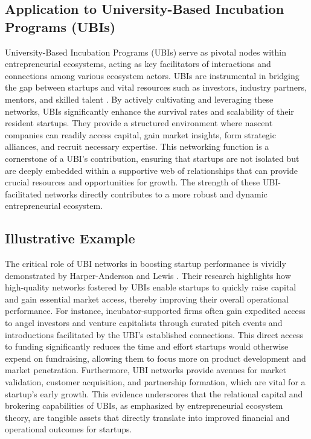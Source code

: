 \documentclass[../Main.tex]{subfiles}
\begin{document}
\subsection{Application to University-Based Incubation Programs (UBIs)}
University-Based Incubation Programs (UBIs) serve as pivotal nodes within entrepreneurial ecosystems, acting as key facilitators of interactions and connections among various ecosystem actors. UBIs are instrumental in bridging the gap between startups and vital resources such as investors, industry partners, mentors, and skilled talent \cite{theodorakopoulos2014business}. By actively cultivating and leveraging these networks, UBIs significantly enhance the survival rates and scalability of their resident startups. They provide a structured environment where nascent companies can readily access capital, gain market insights, form strategic alliances, and recruit necessary expertise. This networking function is a cornerstone of a UBI's contribution, ensuring that startups are not isolated but are deeply embedded within a supportive web of relationships that can provide crucial resources and opportunities for growth. The strength of these UBI-facilitated networks directly contributes to a more robust and dynamic entrepreneurial ecosystem.

\subsection{Illustrative Example}
The critical role of UBI networks in boosting startup performance is vividly demonstrated by Harper-Anderson and Lewis \cite{harper2018makes}. Their research highlights how high-quality networks fostered by UBIs enable startups to quickly raise capital and gain essential market access, thereby improving their overall operational performance. For instance, incubator-supported firms often gain expedited access to angel investors and venture capitalists through curated pitch events and introductions facilitated by the UBI's established connections. This direct access to funding significantly reduces the time and effort startups would otherwise expend on fundraising, allowing them to focus more on product development and market penetration. Furthermore, UBI networks provide avenues for market validation, customer acquisition, and partnership formation, which are vital for a startup's early growth. This evidence underscores that the relational capital and brokering capabilities of UBIs, as emphasized by entrepreneurial ecosystem theory, are tangible assets that directly translate into improved financial and operational outcomes for startups.
\end{document}
